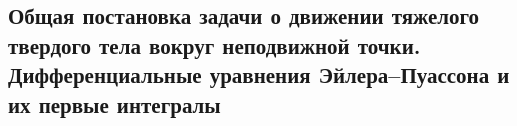 

\subsection{Общая постановка задачи о движении тяжелого твердого тела вокруг неподвижной точки. Дифференциальные уравнения Эйлера–Пуассона и их первые интегралы}



